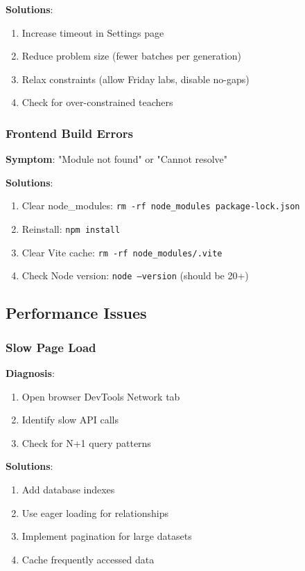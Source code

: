 \documentclass[12pt,a4paper]{article}
\begin{document}
\textbf{Solutions}:
\begin{enumerate}
    \item Increase timeout in Settings page
    \item Reduce problem size (fewer batches per generation)
    \item Relax constraints (allow Friday labs, disable no-gaps)
    \item Check for over-constrained teachers
\end{enumerate}

\subsubsection{Frontend Build Errors}
\textbf{Symptom}: "Module not found" or "Cannot resolve"

\textbf{Solutions}:
\begin{enumerate}
    \item Clear node\_modules: \texttt{rm -rf node\_modules package-lock.json}
    \item Reinstall: \texttt{npm install}
    \item Clear Vite cache: \texttt{rm -rf node\_modules/.vite}
    \item Check Node version: \texttt{node --version} (should be 20+)
\end{enumerate}

\subsection{Performance Issues}

\subsubsection{Slow Page Load}
\textbf{Diagnosis}:
\begin{enumerate}
    \item Open browser DevTools Network tab
    \item Identify slow API calls
    \item Check for N+1 query patterns
\end{enumerate}

\textbf{Solutions}:
\begin{enumerate}
    \item Add database indexes
    \item Use eager loading for relationships
    \item Implement pagination for large datasets
    \item Cache frequently accessed data
\end{enumerate}
\end{document}
